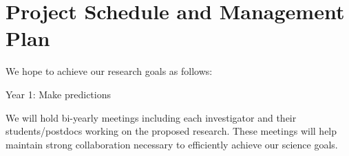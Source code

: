 \section{Project Schedule and Management Plan}

We hope to achieve our research goals as follows:

Year 1: Make predictions  

We will  hold bi-yearly meetings including each investigator and their students/postdocs working on the proposed research. These meetings will help maintain strong collaboration necessary to efficiently achieve our science goals.

